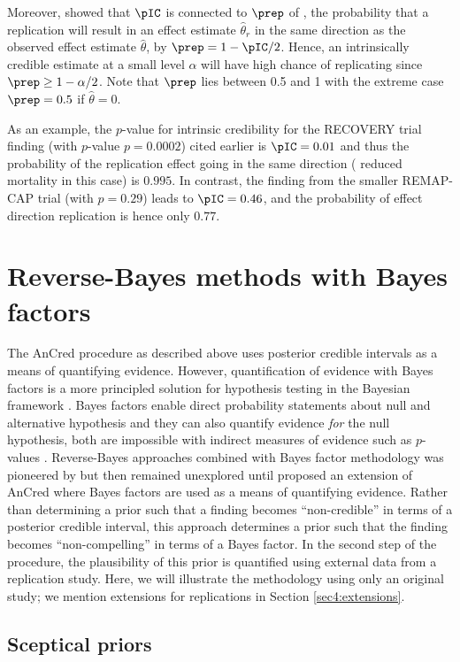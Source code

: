 Moreover, \citet{Held2019a} showed that $\pIC$ is connected to $\prep$ of
\citet{Killeen2005}, the probability that a replication will result in an effect
estimate $\hat{\theta}_r$ in the same direction as the observed effect estimate
$\hat{\theta}$, by $\prep = 1 - \pIC/2$. Hence, an intrinsically credible
estimate at a small level $\alpha$ will have high chance of replicating since
$\prep \geq 1 - \alpha/2$. Note that $\prep$ lies between 0.5 and 1 with the
extreme case $\prep=0.5$ if $\hat \theta=0$.

As an example, the $p$-value for intrinsic credibility for the RECOVERY trial
finding (with $p$-value $p=0.0002$) cited earlier is $\pIC = 0.01$ and thus the
probability of the replication effect going in the same direction (\ie{} reduced
mortality in this case) is $0.995$. In contrast, the finding from the smaller
REMAP-CAP trial (with $p=0.29$) leads to $\pIC = 0.46$, and the probability of
effect direction replication is hence only $0.77$.

\section{Reverse-Bayes methods with Bayes factors}
\label{sec4:bfs}
The AnCred procedure as described above uses posterior credible intervals as a
means of quantifying evidence. However, quantification of evidence with Bayes
factors is a more principled solution for hypothesis testing in the Bayesian
framework \citep{Jeffreys1961, Kass1995}. Bayes factors enable direct
probability statements about null and alternative hypothesis and they can also
quantify evidence \emph{for} the null hypothesis, both are impossible with
indirect measures of evidence such as $p$-values \citep{Held2018}.
Reverse-Bayes approaches combined with Bayes factor methodology was pioneered by
\citet{Carlin1996} but then remained unexplored until \citet{Pawel2020b}
proposed an extension of AnCred where Bayes factors are used as a means of
quantifying evidence. Rather than determining a prior such that a finding
becomes ``non-credible'' in terms of a posterior credible interval, this
approach determines a prior such that the finding becomes ``non-compelling'' in
terms of a Bayes factor. In the second step of the procedure, the plausibility
of this prior is quantified using external data from a replication study. Here,
we will illustrate the methodology using only an original study; we mention
extensions for replications in Section \ref{sec4:extensions}.

\subsection{Sceptical priors}\label{sec4:sceptical}

